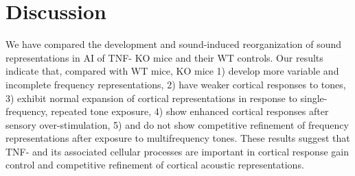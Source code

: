 \section{Discussion}

We have compared the development and sound-induced reorganization of sound representations in AI of TNF-\textalpha{} KO mice and their WT controls. Our results indicate that, compared with WT mice, KO mice 1) develop more variable and incomplete frequency representations, 2) have weaker cortical responses to tones, 3) exhibit normal expansion of cortical representations in response to single-frequency, repeated tone exposure, 4) show enhanced cortical responses after sensory over-stimulation, 5) and do not show competitive refinement of frequency representations after exposure to multifrequency tones. These results suggest that TNF-\textalpha{} and its associated cellular processes are important in cortical response gain control and competitive refinement of cortical acoustic representations.

